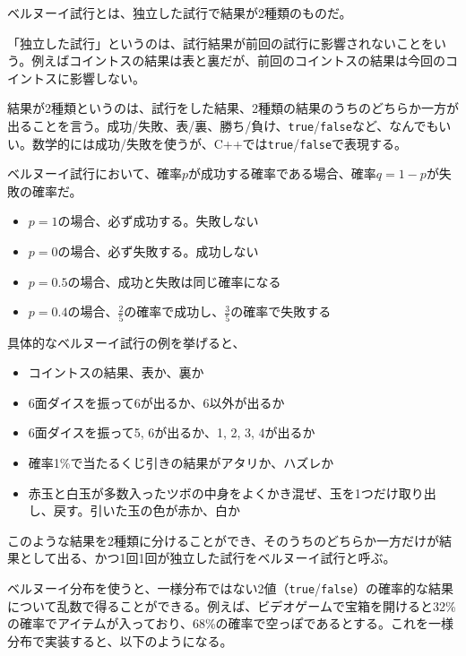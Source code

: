 
ベルヌーイ試行とは、独立した試行で結果が2種類のものだ。

「独立した試行」というのは、試行結果が前回の試行に影響されないことをいう。例えばコイントスの結果は表と裏だが、前回のコイントスの結果は今回のコイントスに影響しない。

結果が2種類というのは、試行をした結果、2種類の結果のうちのどちらか一方が出ることを言う。成功/失敗、表/裏、勝ち/負け、\texttt{true}/\texttt{false}など、なんでもいい。数学的には成功/失敗を使うが、C++では\texttt{true}/\texttt{false}で表現する。

ベルヌーイ試行において、確率\(p\)が成功する確率である場合、確率\(q=1-p\)が失敗の確率だ。

\begin{itemize}
\item
  \(p=1\)の場合、必ず成功する。失敗しない
\item
  \(p=0\)の場合、必ず失敗する。成功しない
\item
  \(p=0.5\)の場合、成功と失敗は同じ確率になる
\item
  \(p=0.4\)の場合、\(\frac{2}{5}\)の確率で成功し、\(\frac{3}{5}\)の確率で失敗する
\end{itemize}

具体的なベルヌーイ試行の例を挙げると、

\begin{itemize}
\item
  コイントスの結果、表か、裏か
\item
  6面ダイスを振って6が出るか、6以外が出るか
\item
  6面ダイスを振って5, 6が出るか、1, 2, 3, 4が出るか
\item
  確率1\%で当たるくじ引きの結果がアタリか、ハズレか
\item
  赤玉と白玉が多数入ったツボの中身をよくかき混ぜ、玉を1つだけ取り出し、戻す。引いた玉の色が赤か、白か
\end{itemize}

このような結果を2種類に分けることができ、そのうちのどちらか一方だけが結果として出る、かつ1回1回が独立した試行をベルヌーイ試行と呼ぶ。

ベルヌーイ分布を使うと、一様分布ではない2値（\texttt{true}/\texttt{false}）の確率的な結果について乱数で得ることができる。例えば、ビデオゲームで宝箱を開けると32\%の確率でアイテムが入っており、68\%の確率で空っぽであるとする。これを一様分布で実装すると、以下のようになる。

